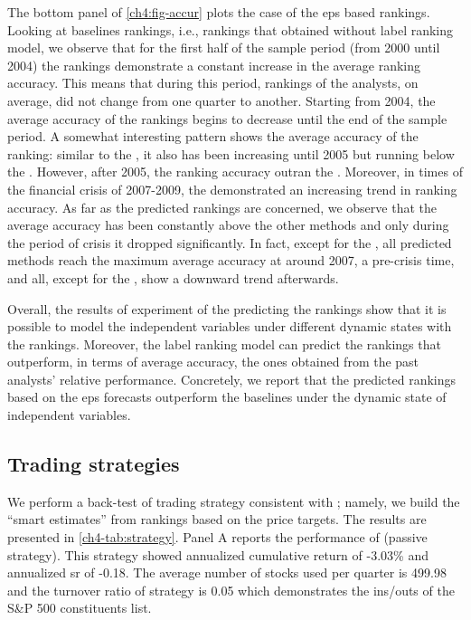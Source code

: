 \documentclass[a4paper,twoside,12pt,openright,notitlepage]{report}\usepackage[]{graphicx}\usepackage[]{color}
\begin{document}
The bottom panel of \ref{ch4:fig-accur} plots the case of the \gls{eps} based rankings. Looking at baselines rankings, i.e., rankings that obtained without label ranking model, we observe that for the first half of the sample period (from 2000 until 2004) the \naive{} rankings  demonstrate a constant increase in the average ranking accuracy. This means that during this period, rankings of the analysts, on average, did not change from one quarter to another. Starting from 2004, the average accuracy of the \naive{} rankings begins to decrease until the end of the sample period. A somewhat interesting pattern shows the average accuracy of the  ranking: similar to the \naive{}, it also has been increasing until 2005 but running below the \naive{}. However, after 2005, the  ranking accuracy outran the \naive{}. Moreover, in times of the financial crisis of 2007-2009, the  demonstrated an increasing trend in ranking accuracy. As far as the predicted rankings are concerned, we observe that the \diff{} average accuracy has been constantly above the other methods and only during the period of crisis it dropped significantly. In fact, except for the \random{}, all predicted methods reach the maximum average accuracy at around 2007, a pre-crisis time, and all, except for the , show a downward trend afterwards.

Overall, the results of experiment of the predicting the rankings show that it is possible to model the independent variables under different dynamic states with the rankings. Moreover, the label ranking model can predict the rankings that outperform, in terms of average accuracy, the ones  obtained from the past analysts' relative performance. Concretely, we report that the predicted rankings based on the \gls{eps} forecasts outperform the baselines under the \diff{} dynamic state of independent variables.




\subsection{Trading strategies}

We perform  a back-test of  trading  strategy consistent with  \cite{aiguzhinov2015a}; namely, we build the ``smart estimates'' from rankings based on the  price targets. The results are presented in \ref{ch4-tab:strategy}. Panel A reports the performance of \Market{} (passive strategy). This strategy showed annualized cumulative return of -3.03\% and annualized \gls{sr} of -0.18. The average number of stocks used per quarter is 499.98 and the turnover ratio of strategy is 0.05 which demonstrates the ins/outs of the S\&P 500 constituents list.
\end{document}
